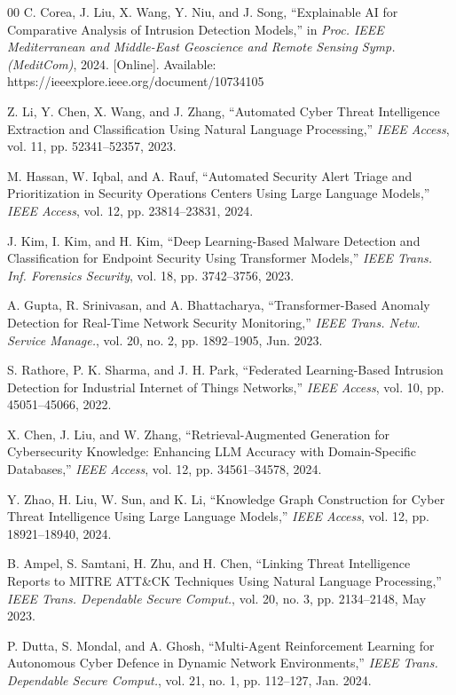 \documentclass[conference]{IEEEtran}
\begin{document}
\begin{thebibliography}{00}
C. Corea, J. Liu, X. Wang, Y. Niu, and J. Song,
``Explainable AI for Comparative Analysis of Intrusion Detection Models,''
in \textit{Proc. IEEE Mediterranean and Middle-East Geoscience and Remote
Sensing Symp. (MeditCom)}, 2024.
[Online]. Available: https://ieeexplore.ieee.org/document/10734105

Z. Li, Y. Chen, X. Wang, and J. Zhang,
``Automated Cyber Threat Intelligence Extraction and Classification Using
Natural Language Processing,''
\textit{IEEE Access}, vol. 11, pp. 52341--52357, 2023.

M. Hassan, W. Iqbal, and A. Rauf,
``Automated Security Alert Triage and Prioritization in Security Operations
Centers Using Large Language Models,''
\textit{IEEE Access}, vol. 12, pp. 23814--23831, 2024.

J. Kim, I. Kim, and H. Kim,
``Deep Learning-Based Malware Detection and Classification for Endpoint
Security Using Transformer Models,''
\textit{IEEE Trans. Inf. Forensics Security}, vol. 18,
pp. 3742--3756, 2023.

A. Gupta, R. Srinivasan, and A. Bhattacharya,
``Transformer-Based Anomaly Detection for Real-Time Network Security
Monitoring,''
\textit{IEEE Trans. Netw. Service Manage.}, vol. 20, no. 2,
pp. 1892--1905, Jun. 2023.

S. Rathore, P. K. Sharma, and J. H. Park,
``Federated Learning-Based Intrusion Detection for Industrial Internet of
Things Networks,''
\textit{IEEE Access}, vol. 10, pp. 45051--45066, 2022.

X. Chen, J. Liu, and W. Zhang,
``Retrieval-Augmented Generation for Cybersecurity Knowledge: Enhancing
LLM Accuracy with Domain-Specific Databases,''
\textit{IEEE Access}, vol. 12, pp. 34561--34578, 2024.

Y. Zhao, H. Liu, W. Sun, and K. Li,
``Knowledge Graph Construction for Cyber Threat Intelligence Using Large
Language Models,''
\textit{IEEE Access}, vol. 12, pp. 18921--18940, 2024.

B. Ampel, S. Samtani, H. Zhu, and H. Chen,
``Linking Threat Intelligence Reports to MITRE ATT\&CK Techniques Using
Natural Language Processing,''
\textit{IEEE Trans. Dependable Secure Comput.}, vol. 20, no. 3,
pp. 2134--2148, May 2023.

P. Dutta, S. Mondal, and A. Ghosh,
``Multi-Agent Reinforcement Learning for Autonomous Cyber Defence in
Dynamic Network Environments,''
\textit{IEEE Trans. Dependable Secure Comput.}, vol. 21, no. 1,
pp. 112--127, Jan. 2024.


\end{thebibliography}
\end{document}
